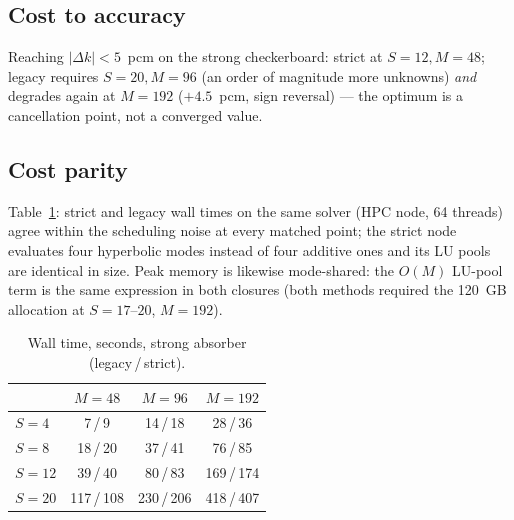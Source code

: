 \documentclass[11pt,a4paper]{article}
\begin{document}
\subsection{Cost to accuracy}
Reaching $|\Delta k|<5$~pcm on the strong checkerboard: strict at
$S{=}12, M{=}48$; legacy requires $S{=}20, M{=}96$ (an order of
magnitude more unknowns) \emph{and} degrades again at $M{=}192$
($+4.5$~pcm, sign reversal) --- the optimum is a cancellation point,
not a converged value.

\subsection{Cost parity}
Table~\ref{tab:cost}: strict and legacy wall times on the same solver
(HPC node, 64 threads) agree within the scheduling noise at every
matched point; the strict node evaluates four hyperbolic modes instead
of four additive ones and its LU pools are identical in size. Peak
memory is likewise mode-shared: the $O(M)$ LU-pool term is the same
expression in both closures (both methods required the 120~GB
allocation at $S{=}17$--$20$, $M{=}192$).

\begin{table}[t]
\centering
\caption{Wall time, seconds, strong absorber (legacy\,/\,strict).}
\label{tab:cost}
\begin{tabular}{lccc}
\toprule
 & $M=48$ & $M=96$ & $M=192$ \\
\midrule
$S=4$  & 7\,/\,9      & 14\,/\,18   & 28\,/\,36 \\
$S=8$  & 18\,/\,20    & 37\,/\,41   & 76\,/\,85 \\
$S=12$ & 39\,/\,40    & 80\,/\,83   & 169\,/\,174 \\
$S=20$ & 117\,/\,108  & 230\,/\,206 & 418\,/\,407 \\
\bottomrule
\end{tabular}
\end{table}
\end{document}
